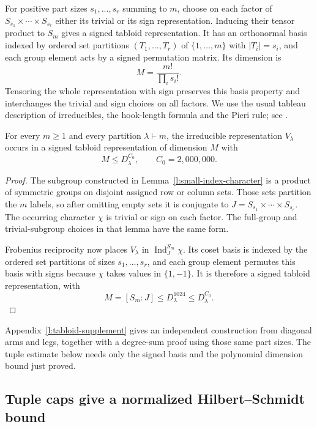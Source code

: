 For positive part sizes $s_1,\ldots,s_r$ summing to $m$, choose on
each factor of $S_{s_1}\times\cdots\times S_{s_r}$ either its trivial
or its sign representation.  Inducing their tensor product to $S_m$
gives a signed tabloid representation.  It has an orthonormal basis
indexed by ordered set partitions $(T_1,\ldots,T_r)$ of $\{1,\ldots,m\}$
with $|T_i|=s_i$, and each group element acts by a signed permutation
matrix.  Its dimension is
\[
 M=\frac{m!}{\prod_i s_i!}.
\]
Tensoring the whole representation with sign preserves this basis
property and interchanges the trivial and sign choices on all factors.
We use the usual tableau description of irreducibles, the hook-length
formula and the Pieri rule; see \cite{sagan,etingof}.

\begin{lemma}
\label{l:tabloid-embedding}
For every $m\ge1$ and every partition $\lambda\vdash m$, the
irreducible representation $V_\lambda$ occurs in a signed tabloid
representation of dimension $M$ with
\[
 M\le D_\lambda^{C_0},\qquad C_0=2{,}000{,}000.
\]
\end{lemma}

\begin{proof}
The subgroup constructed in Lemma~\ref{l:small-index-character}
is a product of symmetric groups on disjoint assigned row or column
sets. Those sets partition the $m$ labels, so after omitting empty sets
it is conjugate to $J=S_{s_1}\times\cdots\times S_{s_r}$.
The occurring character $\chi$ is trivial or sign on each factor.
The full-group and trivial-subgroup choices in that lemma have the
same form.

Frobenius reciprocity now places $V_\lambda$ in
$\operatorname{Ind}_J^{S_m}\chi$. Its coset basis is indexed by the
ordered set partitions of sizes $s_1,\ldots,s_r$, and each group
element permutes this basis with signs because $\chi$ takes values
in $\{1,-1\}$. It is therefore a signed tabloid representation, with
\[
 M=[S_m:J]\le D_\lambda^{1024}\le D_\lambda^{C_0}.
\]
\end{proof}

Appendix~\ref{l:tabloid-supplement} gives an independent construction
from diagonal arms and legs, together with a degree-sum proof using
those same part sizes. The tuple estimate below needs only the signed
basis and the polynomial dimension bound just proved.

\subsection{Tuple caps give a normalized Hilbert--Schmidt bound}

